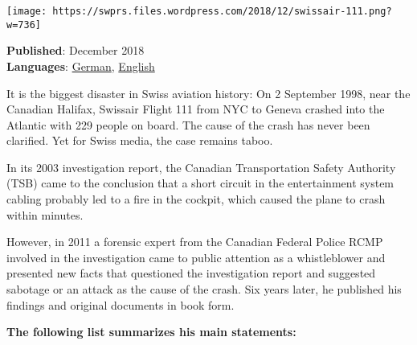 \texttt{[image: https://swprs.files.wordpress.com/2018/12/swissair-111.png?w=736]}

\textbf{Published}: December 2018\\
\textbf{Languages}:
\href{https://swprs.org/der-absturz-swissair-111/}{German},
\href{https://swprs.org/the-crash-of-swissair-111/}{English}

It is the biggest disaster in Swiss aviation history: On 2 September
1998, near the Canadian Halifax, Swissair Flight 111 from NYC to Geneva
crashed into the Atlantic with 229 people on board. The cause of the
crash has never been clarified. Yet for Swiss media, the case remains
taboo.

In its 2003 investigation report, the Canadian Transportation Safety
Authority (TSB) came to the conclusion that a short circuit in the
entertainment system cabling probably led to a fire in the cockpit,
which caused the plane to crash within minutes.

However, in 2011 a forensic expert from the Canadian Federal Police RCMP
involved in the investigation came to public attention as a
whistleblower and presented new facts that questioned the investigation
report and suggested sabotage or an attack as the cause of the crash.
Six years later, he published his findings and original documents in
book form.

\textbf{The following list summarizes his main statements:}

